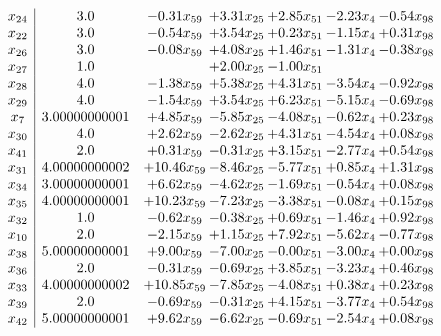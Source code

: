 \documentclass[8pt]{article}
\begin{document}
\[\begin{array}{c| c c@{\hskip 2pt} c@{\hskip 2pt} c@{\hskip 2pt} c@{\hskip 2pt} c@{\hskip 2pt} }
 x_{24}   &  3.0 & -0.31 x_{59} & +  3.31 x_{25} & +  2.85 x_{51} & -2.23 x_{4} & -0.54 x_{98}\\
 x_{22}   &  3.0 & -0.54 x_{59} & +  3.54 x_{25} & +  0.23 x_{51} & -1.15 x_{4} & +  0.31 x_{98}\\
 x_{26}   &  3.0 & -0.08 x_{59} & +  4.08 x_{25} & +  1.46 x_{51} & -1.31 x_{4} & -0.38 x_{98}\\
 x_{27}   &  1.0  &   & +  2.00 x_{25} & -1.00 x_{51} &    &   \\
 x_{28}   &  4.0 & -1.38 x_{59} & +  5.38 x_{25} & +  4.31 x_{51} & -3.54 x_{4} & -0.92 x_{98}\\
 x_{29}   &  4.0 & -1.54 x_{59} & +  3.54 x_{25} & +  6.23 x_{51} & -5.15 x_{4} & -0.69 x_{98}\\
 x_{7}   &  3.00000000001 & +  4.85 x_{59} & -5.85 x_{25} & -4.08 x_{51} & -0.62 x_{4} & +  0.23 x_{98}\\
 x_{30}   &  4.0 & +  2.62 x_{59} & -2.62 x_{25} & +  4.31 x_{51} & -4.54 x_{4} & +  0.08 x_{98}\\
 x_{41}   &  2.0 & +  0.31 x_{59} & -0.31 x_{25} & +  3.15 x_{51} & -2.77 x_{4} & +  0.54 x_{98}\\
 x_{31}   &  4.00000000002 & + 10.46 x_{59} & -8.46 x_{25} & -5.77 x_{51} & +  0.85 x_{4} & +  1.31 x_{98}\\
 x_{34}   &  3.00000000001 & +  6.62 x_{59} & -4.62 x_{25} & -1.69 x_{51} & -0.54 x_{4} & +  0.08 x_{98}\\
 x_{35}   &  4.00000000001 & + 10.23 x_{59} & -7.23 x_{25} & -3.38 x_{51} & -0.08 x_{4} & +  0.15 x_{98}\\
 x_{32}   &  1.0 & -0.62 x_{59} & -0.38 x_{25} & +  0.69 x_{51} & -1.46 x_{4} & +  0.92 x_{98}\\
 x_{10}   &  2.0 & -2.15 x_{59} & +  1.15 x_{25} & +  7.92 x_{51} & -5.62 x_{4} & -0.77 x_{98}\\
 x_{38}   &  5.00000000001 & +  9.00 x_{59} & -7.00 x_{25} & -0.00 x_{51} & -3.00 x_{4} & +  0.00 x_{98}\\
 x_{36}   &  2.0 & -0.31 x_{59} & -0.69 x_{25} & +  3.85 x_{51} & -3.23 x_{4} & +  0.46 x_{98}\\
 x_{33}   &  4.00000000002 & + 10.85 x_{59} & -7.85 x_{25} & -4.08 x_{51} & +  0.38 x_{4} & +  0.23 x_{98}\\
 x_{39}   &  2.0 & -0.69 x_{59} & -0.31 x_{25} & +  4.15 x_{51} & -3.77 x_{4} & +  0.54 x_{98}\\
 x_{42}   &  5.00000000001 & +  9.62 x_{59} & -6.62 x_{25} & -0.69 x_{51} & -2.54 x_{4} & +  0.08 x_{98}\\

\end{array}\]
\end{document}
